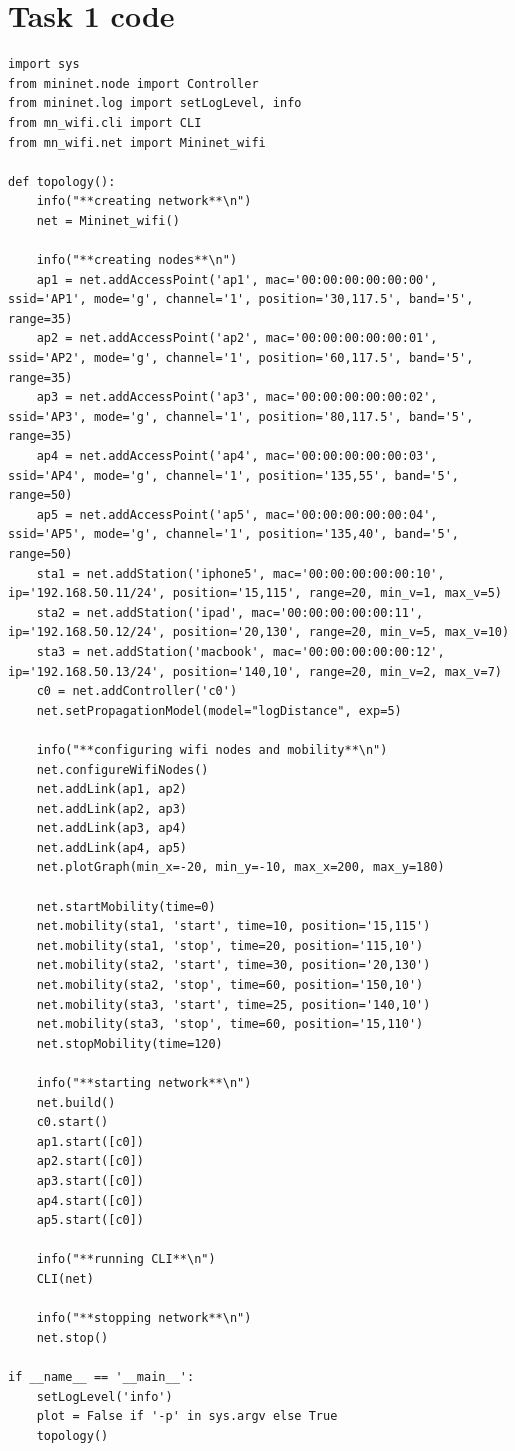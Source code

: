 \documentclass{article}
\begin{document}
\section{Task 1 code}
\begin{lstlisting}
import sys
from mininet.node import Controller
from mininet.log import setLogLevel, info
from mn_wifi.cli import CLI
from mn_wifi.net import Mininet_wifi

def topology():
    info("**creating network**\n")
    net = Mininet_wifi()

    info("**creating nodes**\n")
    ap1 = net.addAccessPoint('ap1', mac='00:00:00:00:00:00', ssid='AP1', mode='g', channel='1', position='30,117.5', band='5', range=35)
    ap2 = net.addAccessPoint('ap2', mac='00:00:00:00:00:01', ssid='AP2', mode='g', channel='1', position='60,117.5', band='5', range=35)
    ap3 = net.addAccessPoint('ap3', mac='00:00:00:00:00:02', ssid='AP3', mode='g', channel='1', position='80,117.5', band='5', range=35)
    ap4 = net.addAccessPoint('ap4', mac='00:00:00:00:00:03', ssid='AP4', mode='g', channel='1', position='135,55', band='5', range=50)
    ap5 = net.addAccessPoint('ap5', mac='00:00:00:00:00:04', ssid='AP5', mode='g', channel='1', position='135,40', band='5', range=50)
    sta1 = net.addStation('iphone5', mac='00:00:00:00:00:10', ip='192.168.50.11/24', position='15,115', range=20, min_v=1, max_v=5)
    sta2 = net.addStation('ipad', mac='00:00:00:00:00:11', ip='192.168.50.12/24', position='20,130', range=20, min_v=5, max_v=10)
    sta3 = net.addStation('macbook', mac='00:00:00:00:00:12', ip='192.168.50.13/24', position='140,10', range=20, min_v=2, max_v=7)
    c0 = net.addController('c0')
    net.setPropagationModel(model="logDistance", exp=5)

    info("**configuring wifi nodes and mobility**\n")
    net.configureWifiNodes()
    net.addLink(ap1, ap2)
    net.addLink(ap2, ap3)
    net.addLink(ap3, ap4)
    net.addLink(ap4, ap5)
    net.plotGraph(min_x=-20, min_y=-10, max_x=200, max_y=180)

    net.startMobility(time=0)
    net.mobility(sta1, 'start', time=10, position='15,115')
    net.mobility(sta1, 'stop', time=20, position='115,10')
    net.mobility(sta2, 'start', time=30, position='20,130')
    net.mobility(sta2, 'stop', time=60, position='150,10')
    net.mobility(sta3, 'start', time=25, position='140,10')
    net.mobility(sta3, 'stop', time=60, position='15,110')
    net.stopMobility(time=120)

    info("**starting network**\n")
    net.build()
    c0.start()
    ap1.start([c0])
    ap2.start([c0])
    ap3.start([c0])
    ap4.start([c0])
    ap5.start([c0])

    info("**running CLI**\n")
    CLI(net)

    info("**stopping network**\n")
    net.stop()

if __name__ == '__main__':
    setLogLevel('info')
    plot = False if '-p' in sys.argv else True
    topology()
\end{lstlisting}
\end{document}
